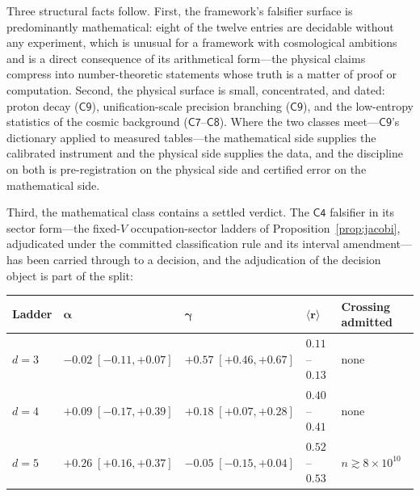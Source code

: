 \documentclass[11pt,a4paper]{article}
\theoremstyle{plain}
\theoremstyle{definition}
\theoremstyle{remark}
\begin{document}
Three structural facts follow. First, the framework's falsifier surface is predominantly
mathematical: eight of the twelve entries are decidable without any experiment, which is
unusual for a framework with cosmological ambitions and is a direct consequence of its
arithmetical form---the physical claims compress into number-theoretic statements whose
truth is a matter of proof or computation. Second, the physical surface is small,
concentrated, and dated: proton decay ($\mathsf{C9}$), unification-scale precision
branching ($\mathsf{C9}$), and the low-entropy statistics of the cosmic background
($\mathsf{C7}$--$\mathsf{C8}$). Where the two classes meet---$\mathsf{C9}$'s dictionary
applied to measured tables---the mathematical side supplies the calibrated instrument and
the physical side supplies the data, and the discipline on both is pre-registration on the
physical side and certified error on the mathematical side.

Third, the mathematical class contains a settled verdict. The $\mathsf{C4}$ falsifier in
its sector form---the fixed-$V$ occupation-sector ladders of
Proposition~\ref{prop:jacobi}, adjudicated under the committed classification rule and
its interval amendment---has been carried through to a decision, and the adjudication
of the decision object is part of the split:

\begin{center}
\small
\begin{tabular}{@{}lllll@{}}
\toprule
\textbf{Ladder} & $\boldsymbol{\alpha}$ & $\boldsymbol{\gamma}$ &
$\boldsymbol{\langle r\rangle}$ & \textbf{Crossing admitted}\\
\midrule
$d=3$ & $-0.02\;[-0.11,+0.07]$ & $+0.57\;[+0.46,+0.67]$ & $0.11$--$0.13$ & none\\
$d=4$ & $+0.09\;[-0.17,+0.39]$ & $+0.18\;[+0.07,+0.28]$ & $0.40$--$0.41$ & none\\
$d=5$ & $+0.26\;[+0.16,+0.37]$ & $-0.05\;[-0.15,+0.04]$ & $0.52$--$0.53$ & $n\gtrsim8\times10^{10}$\\
\bottomrule
\end{tabular}
\end{center}
\end{document}
